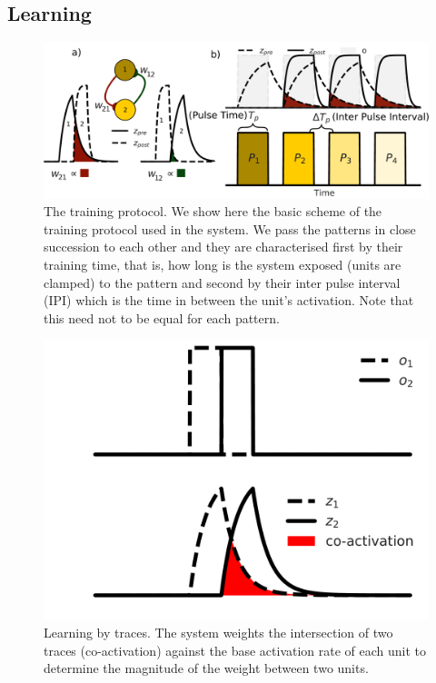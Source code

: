 \documentclass[10pt,a4paper]{article}
\begin{document}
\subsection{Learning}
\begin{figure}[H]
\centering
\includegraphics[scale=1.40]{protocol.pdf}
\caption{The training protocol. We show here the basic scheme of the training protocol used in the system. We pass the patterns in close succession to each other and they are characterised first by their training time, that is, how long is the system exposed (units are clamped) to the pattern and second by their inter pulse interval (IPI) which is the time in between the unit's activation. Note that this need not to be equal for each pattern.}
\label{fig:training_protocol}
\end{figure}


\begin{figure}[H]
\centering
\includegraphics[scale=0.30]{traces_example.pdf}
\caption{Learning by traces. The system weights the intersection of two traces (co-activation) against the base activation rate of each unit to determine the magnitude of the weight between two units. }
\label{fig:traces_example}
\end{figure}
\end{document}

